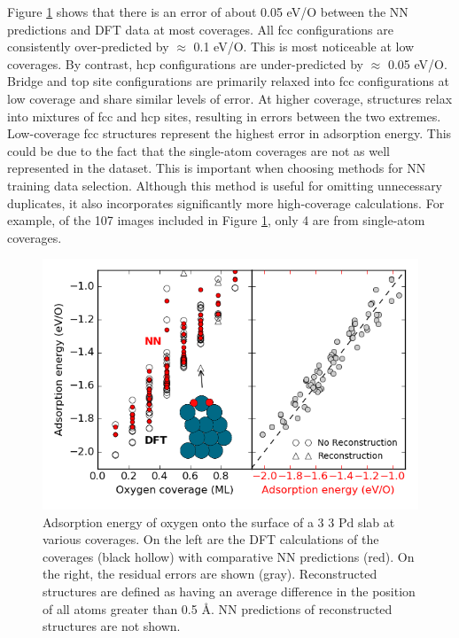 \documentclass[12pt]{cmuthesis}
\begin{document}
Figure \ref{fig-PdO-thermo-coverage} shows that there is an error of about 0.05 eV/O between the NN predictions and DFT data at most coverages. All fcc configurations are consistently over-predicted by \(\approx\) 0.1 eV/O. This is most noticeable at low coverages. By contrast, hcp configurations are under-predicted by \(\approx\) 0.05 eV/O. Bridge and top site configurations are primarily relaxed into fcc configurations at low coverage and share similar levels of error. At higher coverage, structures relax into mixtures of fcc and hcp sites, resulting in errors between the two extremes. Low-coverage fcc structures represent the highest error in adsorption energy. This could be due to the fact that the single-atom coverages are not as well represented in the dataset. This is important when choosing methods for NN training data selection. Although this method is useful for omitting unnecessary duplicates, it also incorporates significantly more high-coverage calculations. For example, of the 107 images included in Figure \ref{fig-PdO-thermo-coverage}, only 4 are from single-atom coverages.

\begin{figure}[htbp]
\centering
\includegraphics[width=5in]{./images/coverage-dependance.png}
\caption{\label{fig-PdO-thermo-coverage}
Adsorption energy of oxygen onto the surface of a 3 \texttimes{} 3 Pd slab at various coverages. On the left are the DFT calculations of the coverages (black hollow) with comparative NN predictions (red). On the right, the residual errors are shown (gray). Reconstructed structures are defined as having an average difference in the position of all atoms greater than 0.5 \AA{}. NN predictions of reconstructed structures are not shown.}
\end{figure}
\end{document}
